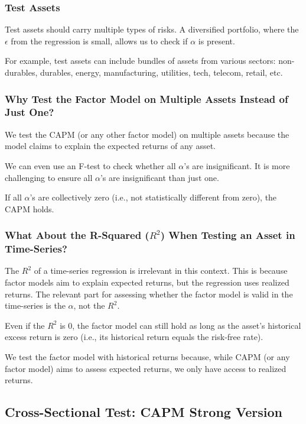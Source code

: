 \documentclass{article}
\begin{document}
\subsubsection{Test Assets}

Test assets should carry multiple types of risks. A diversified portfolio, where the $\epsilon$ from the regression is small, allows us to check if $\alpha$ is present.

For example, test assets can include bundles of assets from various sectors: non-durables, durables, energy, manufacturing, utilities, tech, telecom, retail, etc.

\subsubsection{Why Test the Factor Model on Multiple Assets Instead of Just One?}

We test the CAPM (or any other factor model) on multiple assets because the model claims to explain the expected returns of any asset.

We can even use an F-test to check whether all $\alpha$'s are insignificant. It is more challenging to ensure all $\alpha$'s are insignificant than just one.

If all $\alpha$'s are collectively zero (i.e., not statistically different from zero), the CAPM holds.

\subsubsection{What About the R-Squared ($R^2$) When Testing an Asset in Time-Series?}

The $R^2$ of a time-series regression is irrelevant in this context. This is because factor models aim to explain expected returns, but the regression uses realized returns. The relevant part for assessing whether the factor model is valid in the time-series is the $\alpha$, not the $R^2$.

Even if the $R^2$ is 0, the factor model can still hold as long as the asset's historical excess return is zero (i.e., its historical return equals the risk-free rate).

We test the factor model with historical returns because, while CAPM (or any factor model) aims to assess expected returns, we only have access to realized returns.

\subsection{Cross-Sectional Test: CAPM Strong Version}
\end{document}
